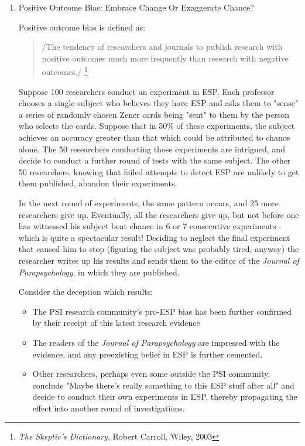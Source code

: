 \documentclass{article}
\begin{document}
\begin{enumerate}
\item Positive Outcome Bias: Embrace Change Or Exaggerate Chance?
\label{sec:orgheadline216}

Positive outcome bias is defined as:

\begin{quote}
/The tendency of researchers and journals to publish research with
positive outcomes much more frequently than research with negative
outcomes./ \footnote{\emph{The Skeptic's Dictionary}, Robert Carroll, Wiley, 2003}
\end{quote}

Suppose 100 researchers conduct an experiment in ESP. Each professor
chooses a single subject who believes they have ESP and asks them to
"sense" a series of randomly chosen Zener cards being "sent" to them by
the person who selects the cards. Suppose that in 50\% of these
experiments, the subject achieves an accuracy greater than that which
could be attributed to chance alone. The 50 researchers conducting those
experiments are intrigued, and decide to conduct a further round of
tests with the same subject. The other 50 researchers, knowing that
failed attempts to detect ESP are unlikely to get them published,
abandon their experiments.

In the next round of experiments, the same pattern occurs, and 25 more
researchers give up. Eventually, all the researchers give up, but not
before one has witnessed his subject beat chance in 6 or 7 consecutive
experiments - which is quite a spectacular result! Deciding to neglect
the final experiment that caused him to stop (figuring the subject was
probably tired, anyway) the researcher writes up his results and sends
them to the editor of the \emph{Journal of Parapsychology}, in which they are
published.

Consider the deception which results:

\begin{itemize}
\item The PSI research community's pro-ESP bias has been further confirmed
by their receipt of this latest research evidence
\item The readers of the \emph{Journal of Parapsychology} are impressed with the
evidence, and any preexisting belief in ESP is further cemented.\\
\item Other researchers, perhaps even some outside the PSI community,
conclude "Maybe there's really something to this ESP stuff after all"
and decide to conduct their own experiments in ESP, thereby
propagating the effect into another round of investigations.
\end{itemize}


\end{enumerate}
\end{document}
